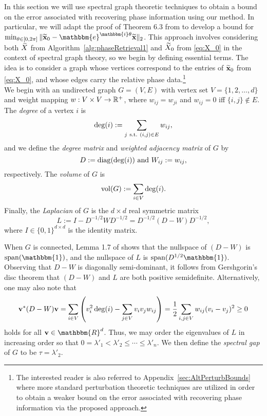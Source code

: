 
 In this section we will use spectral graph theoretic techniques to obtain a bound on the error associated with recovering phase information using our method.  %
In particular, we will adapt the proof of Theorem 6.3 from \cite{alexeev2014phase} to develop a bound for $\min_{\theta\in[0,2\pi]} \Vert \tx_0 - \mathbbm{e}^{\mathbbm{i}\theta}\tx \Vert_2$.  This approach involves considering both $\widetilde{X}$ from Algorithm~\ref{alg:phaseRetrieval1} and $\widetilde{X}_0$ from \eqref{eq:X_0} in the context of spectral graph theory, so we begin by defining essential terms.  The idea is to consider a graph whose vertices correspond to the entries of $\widetilde{\mathbf x}_0$ from \eqref{eq:X_0}, and whose edges carry the relative phase data.\footnote{The interested reader is also referred to Appendix~\ref{sec:AltPerturbBounds} where more standard perturbation theoretic techniques are utilized in order to obtain a  weaker bound on the error associated with recovering phase information via the proposed approach.}
\\

We begin with an undirected graph $G = (V, E)$ with vertex set $V = \{1, 2, \dots, d\}$ and weight mapping $w: V \times V \to \mathbb{R}^+$, where $w_{ij} = w_{ji}$ and $w_{ij} = 0$ iff $\{i, j\} \notin E$.  The \emph{degree} of a vertex $i$ is \[\deg(i) := \sum_{j ~{\rm s.t.}~ (i, j) \in E} w_{ij},\] and we define the \emph{degree matrix} and \emph{weighted adjacency matrix} of $G$ by \[D := \diag(\deg(i)) \ \text{and} \ W_{ij} := w_{ij}, \label{eq:degandweight}\] respectively.  The \emph{volume} of $G$ is \[\mathrm{vol}(G) := \sum_{i \in V} \deg(i).\]  Finally, the \emph{Laplacian} of $G$ is the $d \times d$ real symmetric matrix \begin{equation} L := I - D^{-1/2} W D^{-1/2} = D^{-1/2}(D - W)D^{-1/2}, \label{eq:graph_laplacian_normd}\end{equation}
where $I \in \{ 0,1\}^{d \times d}$ is the identity matrix.  

When $G$ is connected, Lemma 1.7 of \cite{chungspectral} shows that the nullspace of $(D - W)$ is $\Span(\mathbbm{1})$, and the nullspace of $L$ is $\Span(D^{1/2}\mathbbm{1})$.  Observing that $D - W$ is diagonally semi-dominant, it follows from Gershgorin's disc theorem that $(D - W)$ and $L$ are both positive semidefinite.  Alternatively, one may also note that 
\begin{equation*} \mathbf v^*(D - W)\mathbf v = \sum_{i \in V} \left(v_i^2\deg(i) - \sum_{j \in V} v_i v_j w_{ij}\right) = \frac{1}{2} \sum_{i, j \in V} w_{ij} (v_i - v_j)^2 \geq 0 \end{equation*}
holds for all $\v \in \mathbbm{R}^d$.  Thus, we may order the eigenvalues of $L$ in increasing order so that $0 = \lambda'_1 < \lambda'_2 \le \cdots \le \lambda'_n$.  
We then define the \emph{spectral gap} of $G$ to be $\tau = \lambda'_2$.

